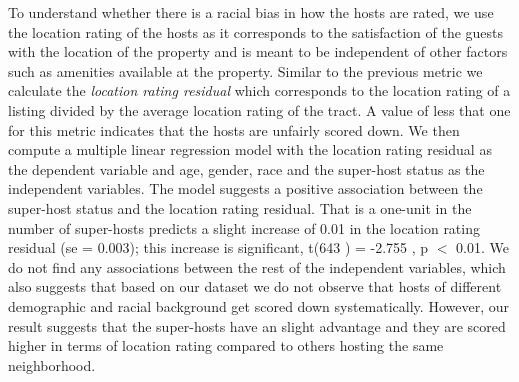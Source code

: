 To understand whether there is a racial bias in how the hosts are rated, we use the location rating of the hosts as it corresponds to the satisfaction of the  guests with the location of the property and is meant to be independent of other factors such as amenities available at the property.  Similar to the previous metric we calculate the \emph{location rating residual} which corresponds to the    location rating of a listing divided by the average location rating of the tract.  A value of less that one for this metric indicates that the hosts are unfairly scored down. We then compute a multiple linear regression model with the location rating residual as the dependent variable  and age, gender,  race and the super-host status as  the independent variables. The model suggests a positive association between the super-host status and the location rating residual. That is a one-unit in the number of super-hosts   predicts a slight increase  of 0.01  in the  location rating residual  (se = 0.003); this increase is significant, t(643 ) = -2.755 , p $<$ 0.01.    We do not find any  associations between the rest of the independent variables, which also suggests that based on our dataset we do not observe that hosts of different demographic and racial background get scored down systematically. However, our result suggests that the super-hosts have an slight advantage and they are scored higher in terms of location rating compared to others hosting the same neighborhood.  


